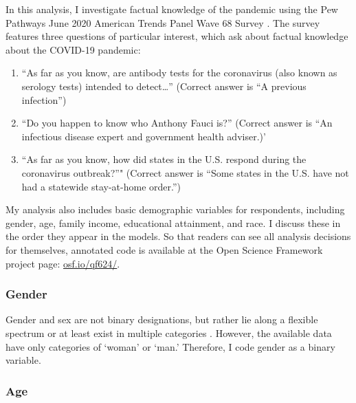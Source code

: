 \documentclass[11pt]{article}
\begin{document}
In this analysis, I investigate factual knowledge of the pandemic using the Pew Pathways June 2020 American Trends Panel Wave 68 Survey \citep{PewJune2020}. The survey features three questions of particular interest, which ask about factual knowledge about the COVID-19 pandemic:

\begin{enumerate}
\def\labelenumi{(\arabic{enumi})}
  \item ``As far as you know, are antibody tests for the coronavirus (also known as serology tests) intended to detect…'' (Correct answer is ``A previous infection'')
  \item ``Do you happen to know who Anthony Fauci is?'' (Correct answer is ``An infectious disease expert and government health adviser.)'
  \item ``As far as you know, how did states in the U.S. respond during the coronavirus outbreak?''" (Correct answer is ``Some states in the U.S. have not had a statewide stay-at-home order.'')
\end{enumerate}

My analysis also includes basic demographic variables for respondents, including gender, age, family income, educational attainment, and race. I discuss these in the order they appear in the models. So that readers can see all analysis decisions for themselves, annotated code is available at the Open Science Framework project page: \url{osf.io/qf624/}.



\subsubsection{Gender}\label{sec:gender-vars}

Gender and sex are not binary designations, but rather lie along a flexible
spectrum or at least exist in multiple categories \citep{Connell2002b,
Fausto-Sterling1993, Fausto-Sterling2000, West1987, Maglioizzi2016}.
However, the available data have only categories of `woman' or
`man.' Therefore, I code gender as a binary variable.

\subsubsection{Age}\label{sec:age-vars}
\end{document}
